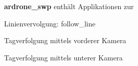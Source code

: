 

{\bfseries ardrone\_\-swp} enthält Applikationen zur 
\begin{DoxyItemize}
\item Linienvervolgung: follow\_\-line 
\item Tagverfolgung mittels vorderer Kamera 
\item Tagverfolgung mittels unterer Kamera 
\end{DoxyItemize}